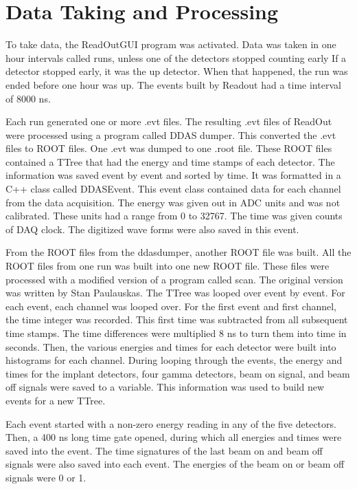 \documentclass[main.tex]{subfiles}
\begin{document}
\section{Data Taking and Processing}
To take data, the ReadOutGUI program was activated. 
Data was taken in one hour intervals called runs, unless one of the detectors stopped counting early
If a detector stopped early, it was the up detector.
When that happened, the run was ended before one hour was up. 
The events built by Readout had a time interval of 8000 ns.

Each run generated one or more .evt files. 
The resulting .evt files of ReadOut were processed using a program called DDAS dumper.
This converted the .evt files to ROOT files.
One .evt was dumped to one .root file. 
These ROOT files contained a TTree that had the energy and time stamps of each detector.
The information was saved event by event and sorted by time. 
It was formatted in a C++ class called DDASEvent. 
This event class contained data for each channel from the data acquisition.
The energy was given out in ADC units and was not calibrated.
These units had a range from 0 to 32767.
The time was given counts of DAQ clock.
The digitized wave forms were also saved in this event. 

From the ROOT files from the ddasdumper, another ROOT file was built.
All the ROOT files from one run was built into one new ROOT file. 
These files were processed with a modified version of a program called scan.
The original version was written by Stan Paulauskas.
The TTree was looped over event by event.
For each event, each channel was looped over. 
For the first event and first channel, the time integer was recorded. 
This first time was subtracted from all subsequent time stamps.
The time differences were multiplied 8 ns to turn them into time in seconds. 
Then, the various energies and times for each detector were built into histograms for each channel. 
During looping through the events, the energy and times for the implant detectors, four gamma detectors, beam on signal, and beam off signals were saved to a variable.
This information was used to build new events for a new TTree.

Each event started with a non-zero energy reading in any of the five detectors.
Then, a 400 ns long time gate opened, during which all energies and times were saved into the event.
The time signatures of the last beam on and beam off signals were also saved into each event.
The energies of the beam on or beam off signals were 0 or 1.
\end{document}
